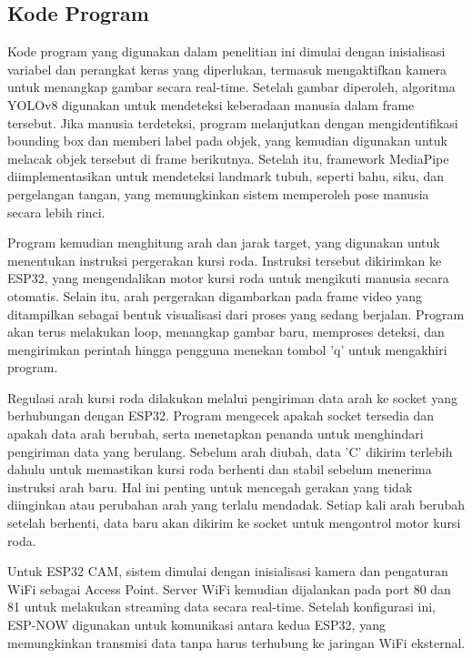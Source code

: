 \subsection{Kode Program}
\label{subsec:kode_program}

Kode program yang digunakan dalam penelitian ini dimulai dengan inisialisasi variabel dan perangkat keras yang diperlukan, termasuk mengaktifkan kamera untuk menangkap gambar secara real-time. Setelah gambar diperoleh, algoritma YOLOv8 digunakan untuk mendeteksi keberadaan manusia dalam frame tersebut. Jika manusia terdeteksi, program melanjutkan dengan mengidentifikasi bounding box dan memberi label pada objek, yang kemudian digunakan untuk melacak objek tersebut di frame berikutnya. Setelah itu, framework MediaPipe diimplementasikan untuk mendeteksi landmark tubuh, seperti bahu, siku, dan pergelangan tangan, yang memungkinkan sistem memperoleh pose manusia secara lebih rinci.

Program kemudian menghitung arah dan jarak target, yang digunakan untuk menentukan instruksi pergerakan kursi roda. Instruksi tersebut dikirimkan ke ESP32, yang mengendalikan motor kursi roda untuk mengikuti manusia secara otomatis. Selain itu, arah pergerakan digambarkan pada frame video yang ditampilkan sebagai bentuk visualisasi dari proses yang sedang berjalan. Program akan terus melakukan loop, menangkap gambar baru, memproses deteksi, dan mengirimkan perintah hingga pengguna menekan tombol 'q' untuk mengakhiri program.

Regulasi arah kursi roda dilakukan melalui pengiriman data arah ke socket yang berhubungan dengan ESP32. Program mengecek apakah socket tersedia dan apakah data arah berubah, serta menetapkan penanda untuk menghindari pengiriman data yang berulang. Sebelum arah diubah, data 'C\n' dikirim terlebih dahulu untuk memastikan kursi roda berhenti dan stabil sebelum menerima instruksi arah baru. Hal ini penting untuk mencegah gerakan yang tidak diinginkan atau perubahan arah yang terlalu mendadak. Setiap kali arah berubah setelah berhenti, data baru akan dikirim ke socket untuk mengontrol motor kursi roda.

Untuk ESP32 CAM, sistem dimulai dengan inisialisasi kamera dan pengaturan WiFi sebagai Access Point. Server WiFi kemudian dijalankan pada port 80 dan 81 untuk melakukan streaming data secara real-time. Setelah konfigurasi ini, ESP-NOW digunakan untuk komunikasi antara kedua ESP32, yang memungkinkan transmisi data tanpa harus terhubung ke jaringan WiFi eksternal.


